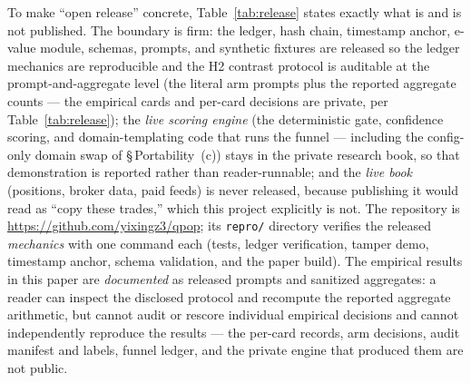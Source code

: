 \documentclass[11pt]{article}
\begin{document}
To make ``open release'' concrete, Table~\ref{tab:release} states exactly what is
and is not published. The boundary is firm: the ledger, hash chain, timestamp anchor,
e-value module, schemas, prompts, and synthetic fixtures are released so
the ledger mechanics are reproducible and the H2 contrast protocol is auditable at the
prompt-and-aggregate level (the literal arm prompts plus the reported aggregate counts --- the
empirical cards and per-card decisions are private, per Table~\ref{tab:release}); the \emph{live scoring
engine} (the deterministic gate, confidence scoring, and domain-templating code that
runs the funnel --- including the config-only domain swap of \S\,Portability~(c)) stays
in the private research book, so that demonstration is reported rather than
reader-runnable; and the \emph{live book} (positions, broker data, paid feeds) is never
released, because publishing it would read as ``copy these trades,'' which this project
explicitly is not. The repository is
\url{https://github.com/yixingz3/qpop}; its \texttt{repro/} directory verifies the released
\emph{mechanics}
with one command each (tests, ledger verification, tamper demo, timestamp anchor, schema validation,
and the paper build). The empirical results in this paper are \emph{documented} as released prompts
and sanitized aggregates: a reader can inspect the disclosed protocol and recompute the reported
aggregate arithmetic, but cannot audit or rescore individual empirical decisions and cannot
independently reproduce the results --- the per-card
records, arm decisions, audit manifest and labels, funnel ledger, and the private engine that
produced them are not public.
\end{document}
